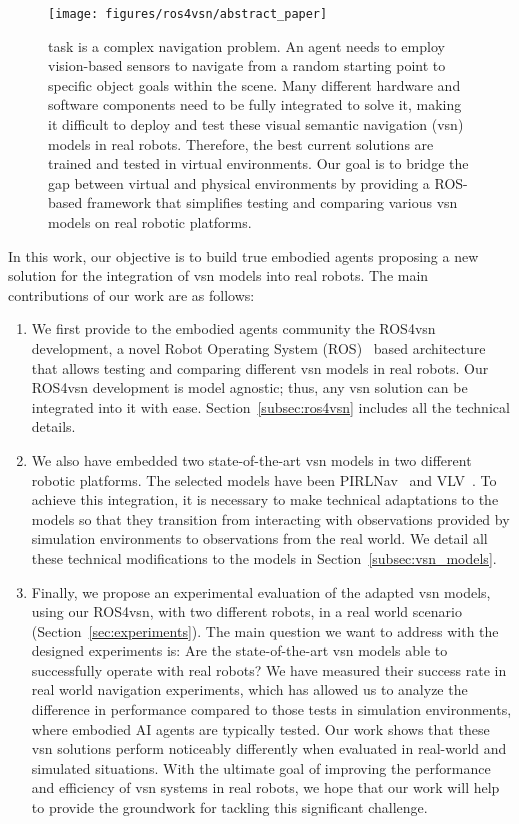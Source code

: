 \begin{figure}
    \centering
        \texttt{[image: figures/ros4vsn/abstract\_paper]}
        \caption{
        \objnav task is a complex navigation problem.
        An agent needs to employ vision-based sensors to navigate from a random starting point to specific object goals within the scene.
        Many different hardware and software components need to be fully integrated to solve it, making it difficult to deploy and test these visual semantic navigation (\acrshort{vsn}) models in real robots.
        Therefore, the best current solutions are trained and tested in virtual environments.
        Our goal is to bridge the gap between virtual and physical environments by providing a ROS-based framework that simplifies testing and comparing various \acrshort{vsn} models on real robotic platforms.
        }
        \label{fig:abstract_ros4vsn}
\end{figure}

In this work, our objective is to build true embodied agents proposing a new solution for the integration of \acrshort{vsn} models into real robots.
The main contributions of our work are as follows:
\begin{enumerate}
 \item We first provide to the embodied agents community the ROS4\acrshort{vsn} development, a novel Robot Operating System (ROS)~\cite{ros} based architecture that allows testing and comparing different \acrshort{vsn} models in real robots.
 Our ROS4\acrshort{vsn} development is model agnostic; thus, any \acrshort{vsn} solution can be integrated into it with ease.
 Section~\ref{subsec:ros4vsn} includes all the technical details.
 \item We also have embedded two state-of-the-art \acrshort{vsn} models in two different robotic platforms.
 The selected models have been PIRLNav~\cite{ramrakhya2023} and VLV~\cite{chang2020}.
 To achieve this integration, it is necessary to make technical adaptations to the models so that they transition from interacting with observations provided by simulation environments to observations from the real world.
 We detail all these technical modifications to the models in Section~\ref{subsec:vsn_models}.
 \item Finally, we propose an experimental evaluation of the adapted \acrshort{vsn} models, using our ROS4\acrshort{vsn}, with two different robots, in a real world scenario (Section~\ref{sec:experiments}).
 The main question we want to address with the designed experiments is: Are the state-of-the-art \acrshort{vsn} models able to successfully operate with real robots?
 We have measured their success rate in real world navigation experiments, which has allowed us to analyze the difference in performance compared to those tests in simulation environments, where embodied AI agents are typically tested.
 Our work shows that these \acrshort{vsn} solutions perform noticeably differently when evaluated in real-world and simulated situations.
 With the ultimate goal of improving the performance and efficiency of \acrshort{vsn} systems in real robots, we hope that our work will help to provide the groundwork for tackling this significant challenge.
\end{enumerate}


